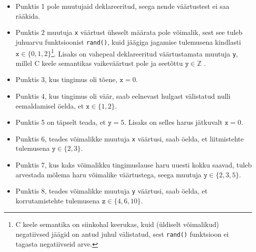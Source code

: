 \documentclass[../thesis.tex]{subfiles}
\begin{document}
\begin{itemize}
	\item Punktis 1 pole muutujaid deklareeritud, seega nende väärtustest ei saa rääkida.
	\item Punktis 2 muutuja \texttt{x} väärtust üheselt määrata pole võimalik, sest see tuleb juhuarvu funktsioonist \texttt{rand()}, kuid jäägiga jagamise tulemusena kindlasti $\texttt{x} \in \{0, 1, 2\}$\footnote{C keele semantika on siinkohal keerukas, kuid (üldiselt võimalikud) negatiivsed jäägid on antud juhul välistatud, sest \texttt{rand()} funktsioon ei tagasta negatiivseid arve.}.
	Lisaks on vahepeal deklareeritud väärtustamata muutuja \texttt{y}, millel C keele semantikas vaikeväärtust pole ja seetõttu $\texttt{y} \in \mathbb{Z}$ \cite{C11_draft}.
	\item Punktis 3, kus tingimus oli tõene, $\texttt{x} = 0$.
	\item Punktis 4, kus tingimus oli väär, saab eelnevast hulgast välistatud nulli eemaldamisel öelda, et $\texttt{x} \in \{1, 2\}$.
	\item Punktis 5 on täpselt teada, et $\texttt{y} = 5$. Lisaks on selles harus jätkuvalt $\texttt{x} = 0$.
	\item Punktis 6, teades võimalikke muutuja \texttt{x} väärtusi, saab öelda, et liitmistehte tulemusena $\texttt{y} \in \{2, 3\}$.
	\item Punktis 7, kus kaks võimalikku tingimuslause haru uuesti kokku saavad, tuleb arvestada mõlema haru võimalike väärtustega, seega muutuja $\texttt{y} \in \{2, 3, 5\}$.
	\item Punktis 8, teades võimalikke muutuja \texttt{y} väärtusi, saab öelda, et korrutamistehte tulemusena $\texttt{z} \in \{4, 6, 10\}$.
\begin{comment}
	\item Punktides 1, 2 ja 3 on muutuja veel väärtustamata. Kuna C keele semantika sellisel juhul mingit vaikeväärtust ei anna, siis võimalikke väärtusi kirjeldab kõige ebatäpsem domeeni element $\top = \mathbb{Z}$.
	\item Punktis 4 on muutujale just antud konstantne väärtus, mistõttu seda kirjeldab kõige paremini element $\{5\}$.

		Iseenesest poleks vale seostada selle programmi punktiga mõnda (osalise järjestuse järgi) üldisemat seisundit, nt $\{5, 6, 7\}$ või lausa $\top$, kuid see poleks nii kasulik, sest analüüsi mõte on siiski leida võimalikult täpne kirjeldus. Just selle täpsuse matemaatiliseks kirjeldamiseks nõutaksegi osalist järjestust.
	\item Punktiga 5 sobib samal põhjusel seostada element $\{3\}$.
	\item Punktis 6 on olukord huvitavam, sest seda seisundit pole programmis oleva hargnemise (täpsemalt selle ühendumise) tõttu kirjeldada ühe täisarvuga, vaid elemendiga $\{3, 5\}$. Selle tulemuseni jõudmiseks peab intuitiivselt ühendama eelneva kahe punkti seisundid --- leidma seisundi, mis hõlmaks eelnevaid, olles seejuures võimalikult täpne. Just selleks nõutaksegi ülemise raja leidmise tehet, millega seda teha. Antud juhul $\{3\} \sqcup \{5\} = \{3, 5\}$.
\end{comment}
\end{itemize}
\end{document}
